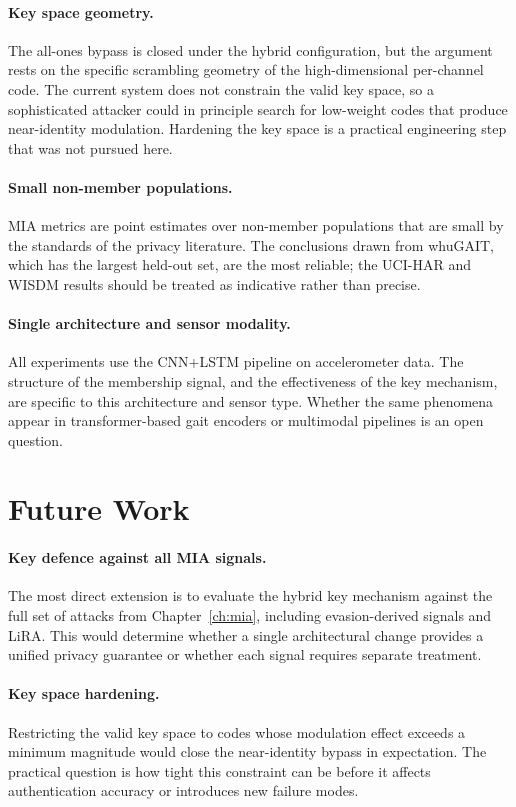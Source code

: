 \paragraph{Key space geometry.}
The all-ones bypass is closed under the hybrid configuration, but the argument rests on the specific scrambling geometry of the high-dimensional per-channel code. The current system does not constrain the valid key space, so a sophisticated attacker could in principle search for low-weight codes that produce near-identity modulation. Hardening the key space is a practical engineering step that was not pursued here.

\paragraph{Small non-member populations.}
MIA metrics are point estimates over non-member populations that are small by the standards of the privacy literature. The conclusions drawn from whuGAIT, which has the largest held-out set, are the most reliable; the UCI-HAR and WISDM results should be treated as indicative rather than precise.

\paragraph{Single architecture and sensor modality.}
All experiments use the CNN+LSTM pipeline on accelerometer data. The structure of the membership signal, and the effectiveness of the key mechanism, are specific to this architecture and sensor type. Whether the same phenomena appear in transformer-based gait encoders or multimodal pipelines is an open question.

\section{Future Work}
\label{sec:con_future}

\paragraph{Key defence against all MIA signals.}
The most direct extension is to evaluate the hybrid key mechanism against the full set of attacks from Chapter~\ref{ch:mia}, including evasion-derived signals and LiRA. This would determine whether a single architectural change provides a unified privacy guarantee or whether each signal requires separate treatment.

\paragraph{Key space hardening.}
Restricting the valid key space to codes whose modulation effect exceeds a minimum magnitude would close the near-identity bypass in expectation. The practical question is how tight this constraint can be before it affects authentication accuracy or introduces new failure modes.

